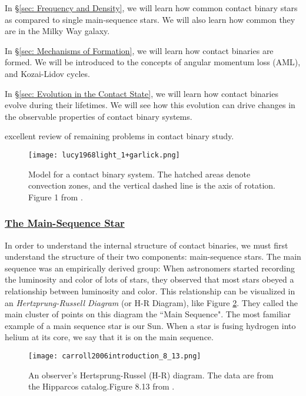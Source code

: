 \documentclass[12pt]{article} %
\numberwithin{equation}{section} %
\begin{document}
In \S \ref{sec: Frequency and Density}, we will learn how common contact binary stars as compared to single main-sequence stars. We will also learn how common they are in the Milky Way galaxy.

In \S \ref{sec: Mechanisms of Formation}, we will learn how contact binaries are formed. We will be introduced to the concepts of angular momentum loss (AML), and Kozai-Lidov cycles.

In \S \ref{sec: Evolution in the Contact State}, we will learn how contact binaries evolve during their lifetimes. We will see how this evolution can drive changes in the observable properties of contact binary systems.


\citep[p.76, ][]{webbink2003contact} excellent review of remaining problems in contact binary study. 

\begin{figure}[H]
\centering
\texttt{[image: lucy1968light\_1+garlick.png]}
\caption{Model for a contact binary system. The hatched areas denote convection zones, and the vertical dashed line is the axis of rotation. Figure 1 from \citet{lucy1968light}.}
\label{fig: lucy1968light_1}
\end{figure}

\subsubsection[The Main-Sequence Star]{\hyperlink{toc}{The Main-Sequence Star}} \label{sec: The Main-Sequence Star}

In order to understand the internal structure of contact binaries, we must first understand the structure of their two components: main-sequence stars.  The main sequence was an empirically derived group: When astronomers started recording the luminosity and color of lots of stars, they observed that most stars obeyed a relationship between luminosity and color. This relationship can be visualized in an \emph{Hertzprung-Russell Diagram} (or H-R  Diagram), like Figure \ref{fig: carroll2006introduction_8_13}. They called the main cluster of points on this diagram the ``Main Sequence". The most familiar example of a main sequence star is our Sun. When a star is fusing hydrogen into helium at its core, we say that it is on the main sequence.

\begin{figure}[H]
\centering
\texttt{[image: carroll2006introduction\_8\_13.png]}
\caption{An observer's Hertsprung-Russel (H-R) diagram. The data are from the Hipparcos catalog.Figure 8.13 from \citet{carroll2006introduction}.}
\label{fig: carroll2006introduction_8_13}
\end{figure}
\end{document}
